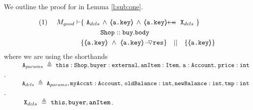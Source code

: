 \begin{proofO}
%

We outline the proof for  in Lemma \ref{l:sub:one}.

\end{proofO}

\newcommand{\Aparams}{\prg{A}_{params}}
\newcommand{\Alocals}{\prg{A}_{dcls}}
\newcommand{\Ids}{\prg{X}_{dcls}}
\newcommand{\stmtsP}{\prg{stmts}_{10,11,12}}
\newcommand{\step}[1]{ \vspace{.1cm} \noindent {\textbf{#1}}}

\begin{lemma}
\label{l:sub:one}
 
\begin{align*}
\text{(1)}  \ \ \ \ M_{good} \vdash 
		&	\{  \ \Alocals\,\wedge\, {\inside{\prg{a.key}}} \, \wedge \, \protectedFrom {\prg{a.key}} {\Ids}  \  \} \\
		& \SPT \prg{Shop}::\prg{buy}.\prg{body}\ \\  
		& \{ {\inside{\prg{a.key}}}\ \wedge\ {\PushASLong {\prg{res}} {\inside{\prg{a.key}}}}  \} \ \ \  || \ \ \ 
		   \{ {\inside{\prg{a.key}}} \}
\end{align*}
where we are using the shorthands\\
 $ \SPT  \Aparams\ \triangleq \  \prg{this}:\prg{Shop}, \prg{buyer} : \prg{external}, \prg{anItem} : \prg{Item},\, \prg{a}:\prg{Account},\, \prg{price} : \prg{int}$.\\
  $ \SPT  \Alocals\ \triangleq \  \Aparams,  \prg{myAccnt} : \prg{Account},\, \prg{oldBalance}:  \prg{int},  \prg{newBalance}:  \prg{int},  \prg{tmp}:  \prg{int}$.\\
   $ \SPT  \Ids\ \triangleq \   \prg{this}, \prg{buyer}, \prg{anItem}$.\\

\end{lemma}

